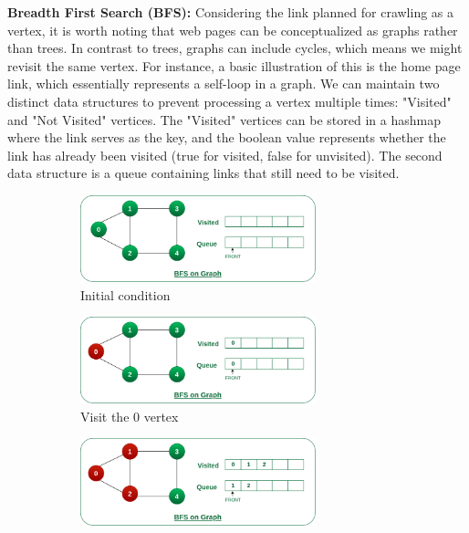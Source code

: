 \textbf{Breadth First Search (BFS):} Considering the link planned for crawling as a vertex, it is worth noting that web pages can be conceptualized as graphs rather than trees. In contrast to trees, graphs can include cycles, which means we might revisit the same vertex. For instance, a basic illustration of this is the home page link, which essentially represents a self-loop in a graph. We can maintain two distinct data structures to prevent processing a vertex multiple times: "Visited" and "Not Visited" vertices. The "Visited" vertices can be stored in a hashmap where the link serves as the key, and the boolean value represents whether the link has already been visited (true for visited, false for unvisited). The second data structure is a queue containing links that still need to be visited.

\begin{figure}[ht] 
  \begin{subfigure}[b]{0.5\textwidth}
    \centering
    \includegraphics[width=0.75\textwidth]{images/bfs-1.png} 
    \caption{Initial condition} 
    \label{fig7:a} 
    \vspace{4ex}
  \end{subfigure}%
  \begin{subfigure}[b]{0.5\textwidth}
    \centering
    \includegraphics[width=0.75\textwidth]{images/bfs-2.png} 
    \caption{Visit the 0 vertex}  
    \label{fig7:b} 
    \vspace{4ex}
  \end{subfigure} 
  \begin{subfigure}[b]{0.5\textwidth}
    \centering
    \includegraphics[width=0.75\textwidth]{images/bfs-3.png} 

\end{subfigure}
\end{figure}
